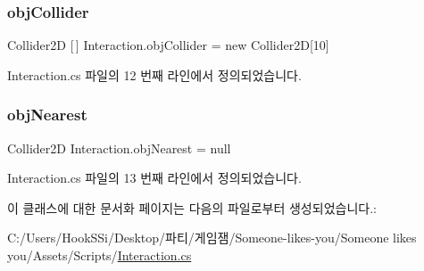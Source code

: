 \subsubsection{\texorpdfstring{objCollider}{objCollider}}
{\footnotesize\ttfamily Collider2D \mbox{[}$\,$\mbox{]} Interaction.\+obj\+Collider = new Collider2D\mbox{[}10\mbox{]}}



Interaction.\+cs 파일의 12 번째 라인에서 정의되었습니다.

\mbox{\label{class_interaction_ae88d3a10f82937f62190d9a68e3e4fee}} 
\subsubsection{\texorpdfstring{objNearest}{objNearest}}
{\footnotesize\ttfamily Collider2D Interaction.\+obj\+Nearest = null}



Interaction.\+cs 파일의 13 번째 라인에서 정의되었습니다.



이 클래스에 대한 문서화 페이지는 다음의 파일로부터 생성되었습니다.\+:\begin{DoxyCompactItemize}
\item 
C\+:/\+Users/\+Hook\+S\+Si/\+Desktop/파티/게임잼/\+Someone-\/likes-\/you/\+Someone likes you/\+Assets/\+Scripts/\mbox{\hyperlink{_interaction_8cs}{Interaction.\+cs}}\end{DoxyCompactItemize}
